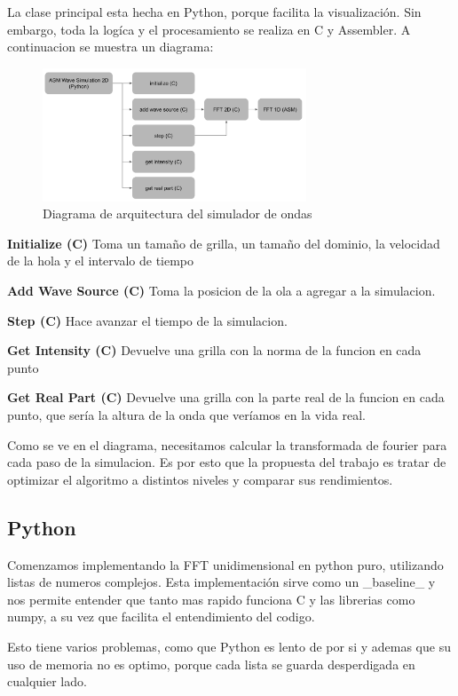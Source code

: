\documentclass[a4paper]{article}
\begin{document}
La clase principal esta hecha en Python, porque facilita la visualización. Sin embargo, toda la logíca y el procesamiento se realiza
en C y Assembler. A continuacion se muestra un diagrama:
\begin{figure}[h]
    \centering
    \includegraphics[width=0.7\textwidth]{extra/diagram.png}
    \caption{Diagrama de arquitectura del simulador de ondas}
    \label{fig:wave_sim_architecture}
\end{figure}

\textbf{Initialize (C)}
Toma un tamaño de grilla, un tamaño del dominio, la velocidad de la hola y el intervalo de tiempo

\textbf{Add Wave Source (C)}
Toma la posicion de la ola a agregar a la simulacion.

\textbf{Step (C)}
Hace avanzar el tiempo de la simulacion.

\textbf{Get Intensity (C)}
Devuelve una grilla con la norma de la funcion en cada punto

\textbf{Get Real Part (C)}
Devuelve una grilla con la parte real de la funcion en cada punto, que sería la altura de la onda que veríamos en la vida real.

Como se ve en el diagrama, necesitamos calcular la transformada de fourier para cada paso de la simulacion. Es por esto que la
propuesta del trabajo es tratar de optimizar el algoritmo a distintos niveles y comparar sus rendimientos.

\subsection{Python}
Comenzamos implementando la FFT unidimensional en python puro, utilizando listas de numeros complejos. Esta implementación sirve
como un _baseline_ y nos permite entender que tanto mas rapido funciona C y las librerias como numpy, a su vez que facilita
el entendimiento del codigo.

Esto tiene varios problemas, como que Python es lento de por si y ademas que su uso de memoria no es optimo, porque cada lista se
guarda desperdigada en cualquier lado.
\end{document}
